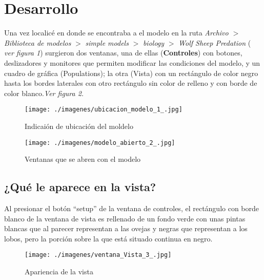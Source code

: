 \documentclass[12pt,letterpaper]{article}
\begin{document}
\section{Desarrollo}

Una vez localicé en donde se encontraba a el modelo en la ruta \textit{Archivo $>$ Biblioteca de modelos} $>$ \textit {simple models} $>$ \textit{ biology } $>$ \textit{Wolf Sheep Predation} (\textit{ ver figura 1}) surgieron dos ventanas, una de ellas (\textbf{Controles}) con botones, deslizadores y monitores que permiten modificar las condiciones del modelo, y un cuadro de gráfica (Populations); la otra (Vista) con un rectángulo de color negro hasta los bordes laterales con otro rectángulo sin color de relleno y con borde de color blanco.\textit{Ver figura 2.}

\begin{figure}[h!]
\begin{floatrow}
\centering
\caption{Indicaión de ubicación del moldelo}
\texttt{[image: ./imagenes/ubicacion\_modelo\_1\_.jpg]}
\label{fig:ruta del modelo}
\end{floatrow}
\end{figure}

\begin{figure}[h!]
\begin{floatrow}
\centering
\caption{Ventanas que se abren con el modelo}
\texttt{[image: ./imagenes/modelo\_abierto\_2\_.jpg]}
\label{fig:controles y vista}
\end{floatrow}
\end{figure}


\subsection{¿Qué le aparece en la vista?}

Al presionar el botón “setup” de la ventana de controles, el rectángulo con borde blanco de la ventana de vista es rellenado de un fondo verde con unas pintas blancas que al parecer representan a las ovejas y negras que representan a los lobos, pero la porción sobre la que está situado continua en negro.

\begin{figure}[h!]
\begin{floatrow}
\centering
\caption{Apariencia de la vista}
\texttt{[image: ./imagenes/ventana\_Vista\_3\_.jpg]}
\label{fig: vista}
%
\end{floatrow}
\end{figure}
\end{document}
